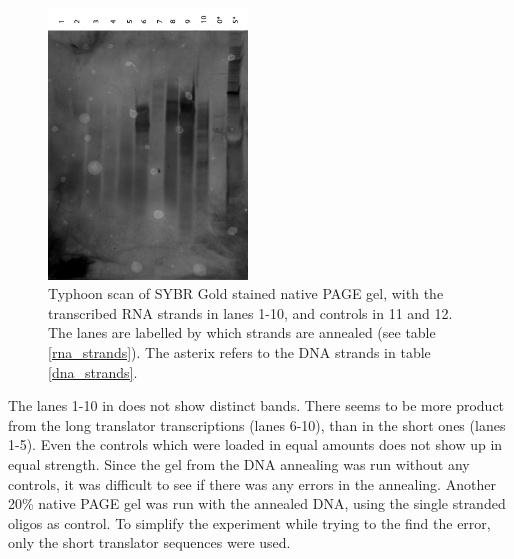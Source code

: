 \begin{figure}[H]
\centering
\includegraphics[width=200]{images/translator_transcription_2.png}
\caption{Typhoon scan of SYBR Gold stained native PAGE gel, with the transcribed RNA strands in lanes 1-10, and controls in 11 and 12. The lanes are labelled by which strands are annealed (see table \ref{rna_strands}). The asterix refers to the DNA strands in table \ref{dna_strands}.}
\label{transcription_2}
\end{figure}

The lanes 1-10 in  does not show distinct bands. There seems to be more product from the long translator transcriptions (lanes 6-10), than in the short ones (lanes 1-5). Even the controls which were loaded in equal amounts does not show up in equal strength. Since the gel from the DNA annealing was run without any controls, it was difficult to see if there was any errors in the annealing. Another 20\% native PAGE gel was run with the annealed DNA, using the single stranded oligos as control. To simplify the experiment while trying to the find the error, only the short translator sequences were used.

